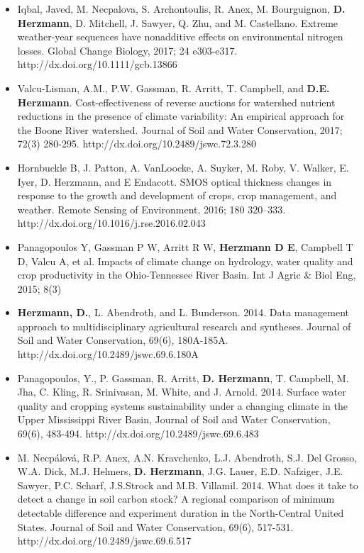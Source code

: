 \begin{itemize}
\item Iqbal, Javed, M. Necpalova, S. Archontoulis, R. Anex, M. Bourguignon, \textbf{D. Herzmann}, D. Mitchell, J. Sawyer, Q. Zhu, and M. Castellano. Extreme weather-year sequences have nonadditive effects on environmental nitrogen losses. Global Change Biology, 2017; 24 e303-e317. http://dx.doi.org/10.1111/gcb.13866
\item Valcu-Lisman, A.M., P.W. Gassman, R. Arritt, T. Campbell, and \textbf{D.E. Herzmann}. Cost-effectiveness of reverse auctions for watershed nutrient reductions in the presence of climate variability: An empirical approach for the Boone River watershed. Journal of Soil and Water Conservation, 2017; 72(3) 280-295. http://dx.doi.org/10.2489/jswc.72.3.280
\item Hornbuckle B, J. Patton, A. VanLoocke, A. Suyker, M. Roby, V. Walker, E. Iyer, D. Herzmann, and E Endacott. SMOS optical thickness changes in response to the growth and development of crops, crop management, and weather. Remote Sensing of Environment, 2016; 180 320–333. http://dx.doi.org/10.1016/j.rse.2016.02.043
\item Panagopoulos Y, Gassman P W, Arritt R W, \textbf{Herzmann D E}, Campbell T D, Valcu A, et al.  Impacts of climate change on hydrology, water quality and crop productivity in the Ohio-Tennessee River Basin.  Int J Agric & Biol Eng, 2015; 8(3)
\item \textbf{Herzmann, D.}, L. Abendroth, and L. Bunderson. 2014. Data management approach to multidisciplinary agricultural research and syntheses. Journal of Soil and Water Conservation, 69(6), 180A-185A. http://dx.doi.org/10.2489/jswc.69.6.180A
\item Panagopoulos, Y., P. Gassman, R. Arritt, \textbf{D. Herzmann}, T. Campbell, M. Jha, C. Kling, R. Srinivasan, M. White, and J. Arnold. 2014. Surface water quality and cropping systems sustainability under a changing climate in the Upper Mississippi River Basin, Journal of Soil and Water Conservation, 69(6), 483-494. http://dx.doi.org/10.2489/jswc.69.6.483
\item M. Necpálová, R.P. Anex, A.N. Kravchenko, L.J. Abendroth, S.J. Del Grosso, W.A. Dick, M.J. Helmers, \textbf{D. Herzmann}, J.G. Lauer, E.D. Nafziger, J.E. Sawyer, P.C. Scharf, J.S.Strock and M.B. Villamil. 2014. What does it take to detect a change in soil carbon stock? A regional comparison of minimum detectable difference and experiment duration in the North-Central United States. Journal of Soil and Water Conservation, 69(6), 517-531. http://dx.doi.org/10.2489/jswc.69.6.517

\end{itemize}
